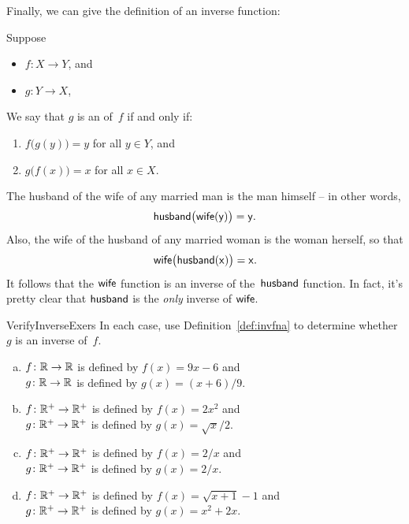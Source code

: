 Finally, we can give the definition of an inverse function:

 \begin{defn}\label{def:invfna}
 Suppose 
 \begin{itemize}
 \item $f \colon X \to Y$,
 and
 \item $g \colon Y \to X$,
\end{itemize}
We say that $g$ is an  of~$f$ if and only if:
 \begin{enumerate} \renewcommand{\theenumi}{\alph{enumi}}
 \item $f \bigl( g(y) \bigr) = y$ for all $y \in Y$,
 and
 \item $g \bigl( f(x) \bigr) = x$ for all $x \in X$.
 \end{enumerate}
 \end{defn}
 

 \begin{example}{}
The husband of the wife of any married man is the man himself -- in other words,
$$ \sf{husband}\bigl( \sf{wife} (y) \bigr) = y. $$
Also, the wife of the husband of any married woman is the woman herself, so that
$$ \sf{wife}\bigl( \sf{husband} (x) \bigr) = x . $$
It follows that
the $\sf{wife}$ function is an inverse of the~$\sf{husband}$ function. In fact, it's pretty clear that $\sf{husband}$ is the \emph{only} inverse of $\sf{wife}$.
\end{example}
 

 \begin{exercise}{VerifyInverseExers}
 In each case, use Definition~\ref{def:invfna} to determine whether $g$ is an inverse of~$f$.
 \begin{enumerate}[(a)]
 \item \label{VerifyInverseExers-(9x-6)}
$f \colon \mathbb{R} \to \mathbb{R}$ is defined by $f(x) = 9x - 6$ and 
 \\ $g \colon \mathbb{R} \to \mathbb{R}$ is defined by $g(x) = (x + 6)/9$.
 \item \label{VerifyInverseExers-(x^2)}
$f \colon \mathbb{R}^+ \to \mathbb{R}^+$ is defined by $f(x) =2x^2$ and 
 \\ $g \colon \mathbb{R}^+ \to \mathbb{R}^+$ is defined by $g(x) = \sqrt{x}/2$.
 \item \label{VerifyInverseExers-(1/x)}
$f \colon \mathbb{R}^+ \to \mathbb{R}^+$ is defined by $f(x) = 2/x$ and 
 \\ $g \colon \mathbb{R}^+ \to \mathbb{R}^+$ is defined by $g(x) = 2/x$.
 \item \label{VerifyInverseExers-(sqrt(x+1)-1)}
$f \colon \mathbb{R}^+ \to \mathbb{R}^+$ is defined by $f(x) = \sqrt{x+1} - 1$ and 
 \\ $g \colon \mathbb{R}^+ \to \mathbb{R}^+$ is defined by $g(x) = x^2 + 2x$.
 \end{enumerate}
 \end{exercise}
   
